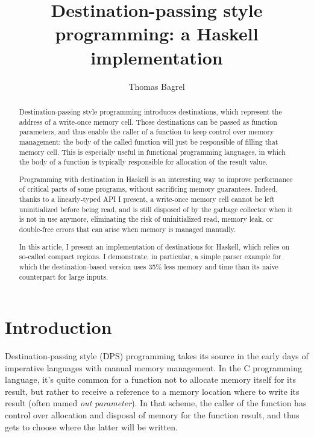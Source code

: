 \documentclass[english]{jflart}
\title{Destination-passing style programming: a Haskell implementation}
\author[1]{Thomas Bagrel}
\affil[1]{INRIA/LORIA, Vand\oe{}uvre-lès-Nancy, 54500, France}
\affil[1]{Tweag, Paris, 75012, France}
\begin{document}
\maketitle

\begin{abstract}
Destination-passing style programming introduces destinations, which represent the address of a write-once memory cell. Those destinations can be passed as function parameters, and thus enable the caller of a function to keep control over memory management: the body of the called function will just be responsible of filling that memory cell. This is especially useful in functional programming languages, in which the body of a function is typically responsible for allocation of the result value.

Programming with destination in Haskell is an interesting way to improve performance of critical parts of some programs, without sacrificing memory guarantees. Indeed, thanks to a linearly-typed API I present, a write-once memory cell cannot be left uninitialized before being read, and is still disposed of by the garbage collector when it is not in use anymore, eliminating the risk of uninitialized read, memory leak, or double-free errors that can arise when memory is managed manually.

In this article, I present an implementation of destinations for Haskell, which relies on so-called compact regions. I demonstrate, in particular, a simple parser example for which the destination-based version uses 35\% less memory and time than its naive counterpart for large inputs.
\end{abstract}


\section{Introduction}

Destination-passing style (DPS) programming takes its source in the early days of imperative languages with manual memory management. In the C programming language, it's quite common for a function not to allocate memory itself for its result, but rather to receive a reference to a memory location where to write its result (often named \emph{out parameter}). In that scheme, the caller of the function has control over allocation and disposal of memory for the function result, and thus gets to choose where the latter will be written.
\end{document}
